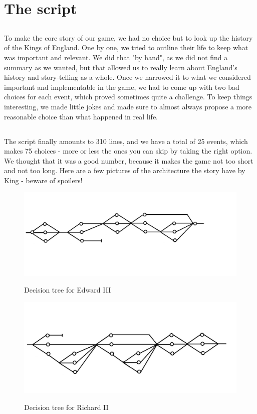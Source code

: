 \documentclass{scrreprt}
\begin{document}
\section{The script}

\subsection*{} To make the core story of our game, we had no choice but to look up the history of the Kings of England. One by one, we tried to outline their life to keep what was important and relevant. We did that "by hand", as we did not find a summary as we wanted, but that allowed us to really learn about England's history and story-telling as a whole. Once we narrowed it to what we considered important and implementable in the game, we had to come up with two bad choices for each event, which proved sometimes quite a challenge. To keep things interesting, we made little jokes and made sure to almost always propose a more reasonable choice than what happened in real life.
\subsection*{} The script finally amounts to 310 lines, and we have a total of 25 events, which makes 75 choices - more or less the ones you can skip by taking the right option. We thought that it was a good number, because it makes the game not too short and not too long. Here are a few pictures of the architecture the story have by King - beware of spoilers!

\begin{figure}
	\includegraphics[scale=0.7]{Edward3.jpg}
	\begin{center}
		Decision tree for Edward III
	\end{center}
\end{figure}

\begin{figure}
	\includegraphics[scale=0.7]{Richard2.jpg}
	\begin{center}
		Decision tree for Richard II
	\end{center}
\end{figure}
\end{document}
